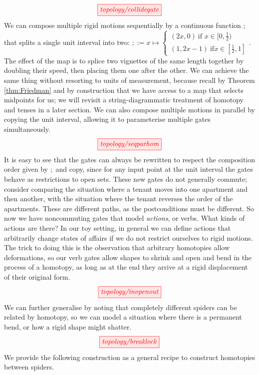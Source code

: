 \[\tikzfig{topology/collidegate}\]
We can compose multiple rigid motions sequentially by a continuous function $\mathbf{;}$ that splits a single unit interval into two: $\mathbf{;} := x \mapsto \begin{cases} (2x,0) \ \text{if } x \in [0,\frac{1}{2}) \\ (1,2x - 1) \ \text{if} x \in [\frac{1}{2},1] \end{cases}$. The effect of the map is to splice two vignettes of the same length together by doubling their speed, then placing them one after the other. We can achieve the same thing without resorting to units of measurement, because recall by Theorem \ref{thm:Friedman} and by construction that we have access to a map that selects midpoints for us; we will revisit a string-diagrammatic treatment of homotopy and tenses in a later section. We can also compose multiple motions in parallel by copying the unit interval, allowing it to parameterise multiple gates simultaneously.
\[\tikzfig{topology/seqparhom}\]
It is easy to see that the gates can always be rewritten to respect the composition order given by $\mathbf{;}$ and copy, since for any input point at the unit interval the gates behave as restrictions to open sets. These new gates do not generally commute; consider comparing the situation where a tenant moves into one apartment and then another, with the situation where the tenant reverses the order of the apartments. These are different paths, as the postconditions must be different. So now we have noncommuting gates that model \emph{actions}, or verbs. What kinds of actions are there? In our toy setting, in general we can define actions that arbitrarily change states of affairs if we do not restrict ourselves to rigid motions. The trick to doing this is the observation that arbitrary homotopies allow deformations, so our verb gates allow shapes to shrink and open and bend in the process of a homotopy, as long as at the end they arrive at a rigid displacement of their original form.
\[\tikzfig{topology/inopenout}\]
We can further generalise by noting that completely different spiders can be related by homotopy, so we can model a situation where there is a permanent bend, or how a rigid shape might shatter.
\[\tikzfig{topology/breaklock}\]
We provide the following construction as a general recipe to construct homotopies between spiders.
